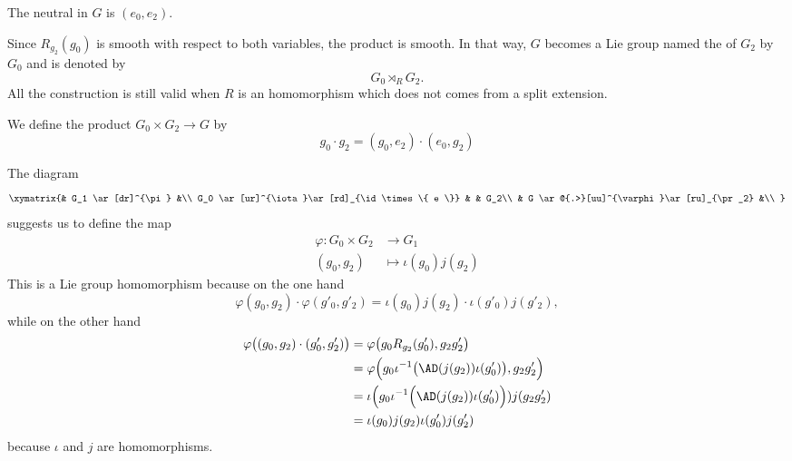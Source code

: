The neutral in $G$ is $(e_0,e_2)$.

Since $R_{g_2}(g_0)$ is smooth with respect to both variables, the product is smooth. In that way, $G$ becomes a Lie group named the  of $G_2$ by $G_0$ and is denoted by
\begin{equation}
    G_0 \rtimes_RG_2.
\end{equation}
All the construction is still valid when $R$ is an homomorphism which does not comes from a split extension.

We define the product $G_0\times G_2\to G$ by
\begin{equation}
    g_0\cdot g_2=(g_0,e_2)\cdot(e_0,g_2)
\end{equation}

The diagram
\begin{equation}
    \xymatrix{%
            &       G_1 \ar[dr]^{\pi}           &\\
            G_0 \ar[ur]^{\iota}\ar[rd]_{\id\times\{ e \}}   &       & G_2\\
            &       G \ar@{.>}[uu]^{\varphi}\ar[ru]_{\pr_2}     &\\
       }
\end{equation}
suggests us to define the map
\begin{equation}
    \begin{aligned}
        \varphi\colon G_0\times G_2&\to G_1 \\
        (g_0,g_2)&\mapsto \iota(g_0)j(g_2)
    \end{aligned}
\end{equation}
This is a Lie group homomorphism because on the one hand
\begin{equation}
    \varphi(g_0,g_2)\cdot \varphi(g'_0,g'_2)=\iota(g_0)j(g_2)\cdot \iota(g'_0)j(g'_2),
\end{equation}
while on the other hand
\begin{equation}
    \begin{aligned}[]
        \varphi\big( (g_0,g_2)\cdot (g'_0,g'_2) \big)&=\varphi\big( g_0R_{g_2}(g'_0),g_2g'_2 \big)\\
        &=\varphi\Big( g_0\iota^{-1}\big( \AD(j(g_2))\iota(g'_0) \big),g_2g'_2 \Big)\\
        &=\iota\Big(g_0\iota^{-1}\Big( \AD(j(g_2))\iota(g'_0) \Big))j(g_2g'_2)\\
        &=\iota(g_0)j(g_2)\iota(g'_0)j(g'_2)
    \end{aligned}
\end{equation}
because $\iota$ and $j$ are homomorphisms.


